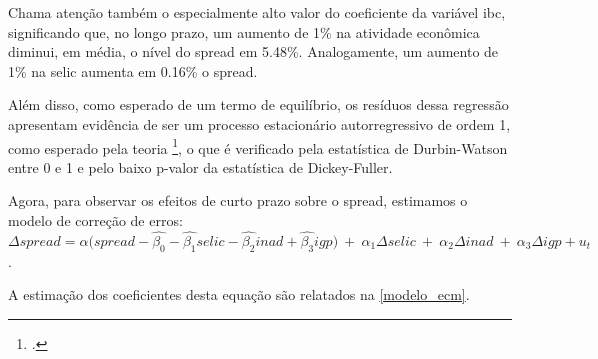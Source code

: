 \documentclass[a4paper,
               article,
               12pt,
               openany,
               oneside,
               english,
               brazil]{abntex2}
\numberwithin{equation}{section}
\begin{document}
    Chama atenção também o especialmente alto valor do coeficiente da variável ibc, significando que, no longo prazo, um aumento de 1\% na atividade econômica diminui, em média, o nível do spread em 5.48\%. Analogamente, um aumento de 1\% na selic aumenta em 0.16\% o spread.

    Além disso, como esperado de um termo de equilíbrio, os resíduos dessa regressão apresentam evidência de ser um processo estacionário autorregressivo de ordem 1, como esperado pela teoria \footcite[12]{coint1}, o que é verificado pela estatística de Durbin-Watson entre 0 e 1 e pelo baixo p-valor da estatística de Dickey-Fuller.

    Agora, para observar os efeitos de curto prazo sobre o spread, estimamos o modelo de correção de erros: $ \Delta \textit{spread} = \alpha (\textit{spread} - \hat{\beta_0} - \hat{\beta_1} \textit{selic} -\hat{\beta_2} \textit{inad} + \hat{\beta_3} \textit{igp)}\ +\ \alpha_1 \Delta \textit{selic}\ +\ \alpha_2 \Delta \textit{inad}\ +\ \alpha_3 \Delta \textit{igp} + u_t $.

    A estimação dos coeficientes desta equação são relatados na \autoref{modelo_ecm}.
\end{document}
